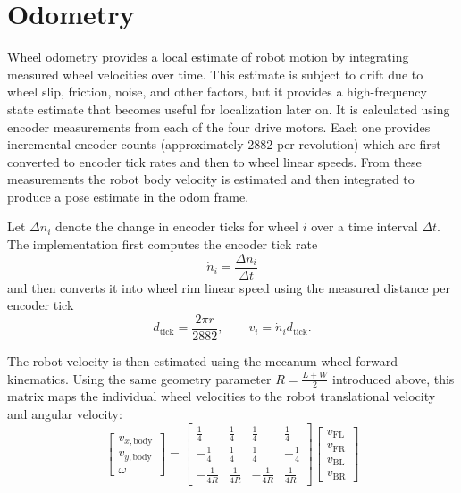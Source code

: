 \documentclass[11pt]{article}
\begin{document}
\section{Odometry}
Wheel odometry provides a local estimate of robot motion by integrating measured wheel velocities over time. This
estimate is subject to
drift due to wheel slip, friction, noise, and other factors, but it provides a high-frequency state estimate that
becomes useful for localization later on.
It is calculated using encoder measurements from each of the four drive motors. Each one provides incremental encoder
counts
(approximately 2882 per revolution) which are first converted to encoder tick rates and then to wheel linear speeds.
From these measurements the robot body velocity is estimated and then integrated
to produce a pose estimate in the odom frame.

Let $\Delta n_i$ denote the change in encoder ticks for wheel $i$ over a
time interval $\Delta t$. The implementation first computes the encoder tick
rate
\[
\dot{n}_i = \frac{\Delta n_i}{\Delta t}
\]
and then converts it into wheel rim linear speed using the measured distance per
encoder tick
\[
d_{\mathrm{tick}} = \frac{2\pi r}{2882},
\qquad
v_i = \dot{n}_i d_{\mathrm{tick}}.
\]

The robot velocity is then estimated using the mecanum wheel forward kinematics. Using the same geometry parameter
\(R=\frac{L+W}{2}\) introduced above, this matrix maps the individual wheel
velocities to the robot translational velocity and angular velocity:
\begin{equation*}
\begin{bmatrix}
v_{x,\mathrm{body}} \\
v_{y,\mathrm{body}} \\
\omega
\end{bmatrix}
=
\begin{bmatrix}
\frac{1}{4} & \frac{1}{4} & \frac{1}{4} & \frac{1}{4} \\
-\frac{1}{4} & \frac{1}{4} & \frac{1}{4} & -\frac{1}{4} \\
-\frac{1}{4R} & \frac{1}{4R} & -\frac{1}{4R} & \frac{1}{4R}
\end{bmatrix}
\begin{bmatrix}
v_{\mathrm{FL}} \\
v_{\mathrm{FR}} \\
v_{\mathrm{BL}} \\
v_{\mathrm{BR}}
\end{bmatrix}
\end{equation*}
\end{document}
